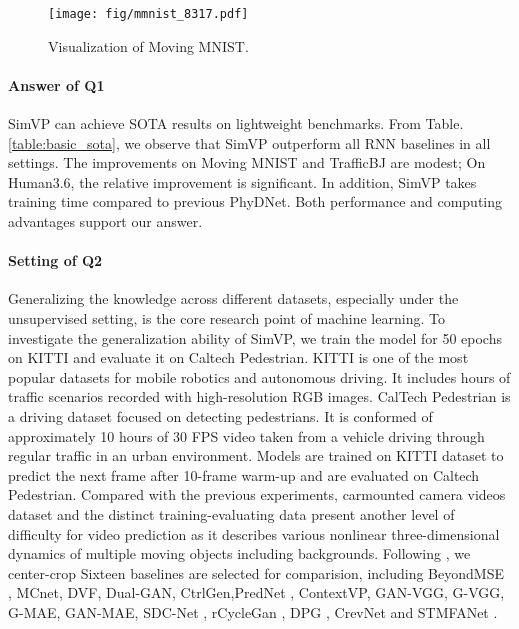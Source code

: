 \documentclass[10pt,twocolumn,letterpaper]{article}
\begin{document}
\begin{figure}[h]
  \centering
      \texttt{[image: fig/mmnist\_8317.pdf]}
    \caption{ Visualization of Moving MNIST.}
    \label{fig:mmnist_8317}
\end{figure}

\vspace{-5mm}
\paragraph{Answer of Q1} SimVP can achieve SOTA results on lightweight benchmarks. From Table. \ref{table:basic_sota}, we observe that SimVP outperform all RNN baselines in all settings. The improvements on Moving MNIST and TrafficBJ are modest;  On Human3.6, the relative improvement is significant. In addition, SimVP takes training time compared to previous PhyDNet. Both performance and computing advantages support our answer.




\vspace{-2mm}
\paragraph{Setting of Q2} Generalizing the knowledge across different datasets, especially under the unsupervised setting, is the core research point of machine learning. To investigate the generalization ability of SimVP, we train the model for 50 epochs on KITTI and evaluate it on Caltech Pedestrian. KITTI \cite{geiger2013vision} is one of the most popular datasets for mobile robotics and autonomous driving. It includes hours of traffic scenarios recorded with high-resolution RGB images. CalTech Pedestrian \cite{dollarCVPR09peds} is a driving dataset focused on detecting pedestrians. It is conformed of approximately 10 hours of  30 FPS video taken from a vehicle driving through regular traffic in an urban environment. Models are trained on KITTI dataset to predict the next frame after 10-frame warm-up and are evaluated on Caltech Pedestrian. Compared with the previous experiments, carmounted camera videos dataset and the distinct training-evaluating data present another level of difficulty for video prediction as it describes various nonlinear three-dimensional dynamics of multiple moving objects including backgrounds. Following \cite{lotter2016deep,yu2019efficient,oprea2020review}, we center-crop  Sixteen baselines are selected for comparision, including BeyondMSE \cite{mathieu2015deep}, MCnet\cite{villegas2017decomposing}, DVF\cite{liu2017video}, Dual-GAN\cite{liang2017dual}, CtrlGen\cite{hao2018controllable},PredNet \cite{lotter2016deep}, ContextVP\cite{byeon2018contextvp}, GAN-VGG, G-VGG, G-MAE, GAN-MAE\cite{shouno2020photo}, SDC-Net \cite{reda2018sdc}, rCycleGan \cite{kwon2019predicting},  DPG \cite{gao2019disentangling}, CrevNet \cite{yu2019efficient} and STMFANet \cite{jin2020exploring}. 
\end{document}
